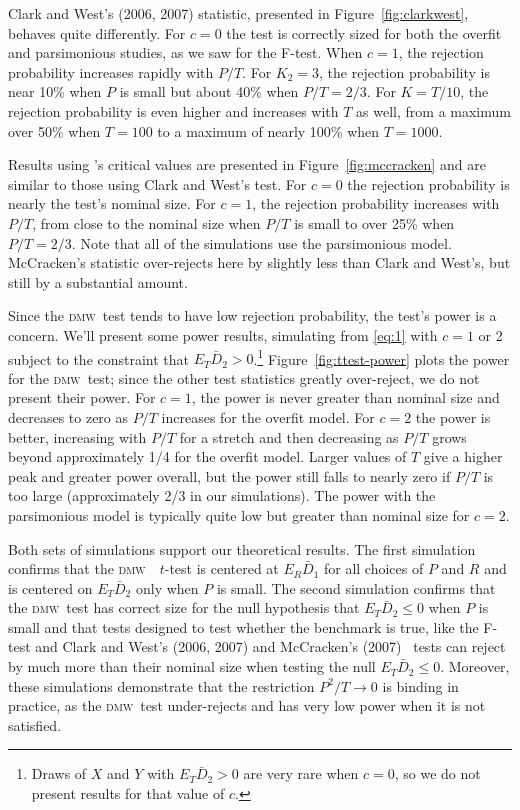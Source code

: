 \documentclass[11pt]{article}
\newcommand{\citepos}[1]{\citeauthor{#1}'s \citeyearpar{#1}}
\newcommand{\dmw}{\textsc{dmw}}
\begin{document}
Clark and West's (2006, 2007) statistic, presented in
Figure~\ref{fig:clarkwest}, behaves quite differently.  For $c=0$ the
test is correctly sized for both the overfit and parsimonious studies,
as we saw for the F-test.  When $c=1$, the rejection probability
increases rapidly with $P/T$.  For $K_2=3$, the rejection probability
is near 10\% when $P$ is small but about 40\% when $P/T = 2/3$.  For
$K=T/10$, the rejection probability is even higher and increases with
$T$ as well, from a maximum over 50\% when $T=100$ to a maximum of
nearly 100\% when $T=1000$.

Results using \citepos{mccracken_asymptotics_2007} critical values are
presented in Figure~\ref{fig:mccracken} and are similar to those using
Clark and West's test.  For $c=0$ the rejection probability is nearly
the test's nominal size.  For $c=1$, the rejection probability
increases with $P/T$, from close to the nominal size when $P/T$ is
small to over 25\% when $P/T = 2/3$.  Note that all of the simulations
use the parsimonious model.  McCracken's statistic over-rejects here
by slightly less than Clark and West's, but still by a substantial
amount.

Since the \dmw\ test tends to have low rejection probability, the
test's power is a concern.  We'll present some power results,
simulating from \eqref{eq:1} with $c = 1$ or 2 subject to the
constraint that $E_T \bar D_2 > 0$.\footnote{Draws of $X$ and $Y$ with
  $E_T \bar D_2 > 0$ are very rare when $c=0$, so we do not present
  results for that value of $c$.}  Figure~\ref{fig:ttest-power} plots
the power for the \dmw\ test; since the other test statistics greatly
over-reject, we do not present their power.  For $c=1$, the power is
never greater than nominal size and decreases to zero as $P/T$
increases for the overfit model.  For $c=2$ the power is better,
increasing with $P/T$ for a stretch and then decreasing as $P/T$ grows
beyond approximately 1/4 for the overfit model.  Larger values of $T$
give a higher peak and greater power overall, but the power still
falls to nearly zero if $P/T$ is too large (approximately 2/3 in our
simulations).  The power with the parsimonious model is typically
quite low but greater than nominal size for $c = 2$.

Both sets of simulations support our theoretical results.  The first
simulation confirms that the \dmw\ \oos\ $t$-test is centered at $E_R
\bar D_1$ for all choices of $P$ and $R$ and is centered on $E_T \bar
D_2$ only when $P$ is small.  The second simulation confirms that the
\dmw\ test has correct size for the null hypothesis that $E_T \bar D_2
\leq 0$ when $P$ is small and that tests designed to test whether the
benchmark is true, like the F-test and Clark and West's (2006, 2007)
and McCracken's (2007) \oos\ tests can reject by much more than their
nominal size when testing the null $E_T \bar D_2 \leq 0$.
Moreover, these simulations demonstrate that the restriction $P^2/T
\to 0$ is binding in practice, as the \dmw\ test under-rejects and has
very low power when it is not satisfied.
\end{document}
